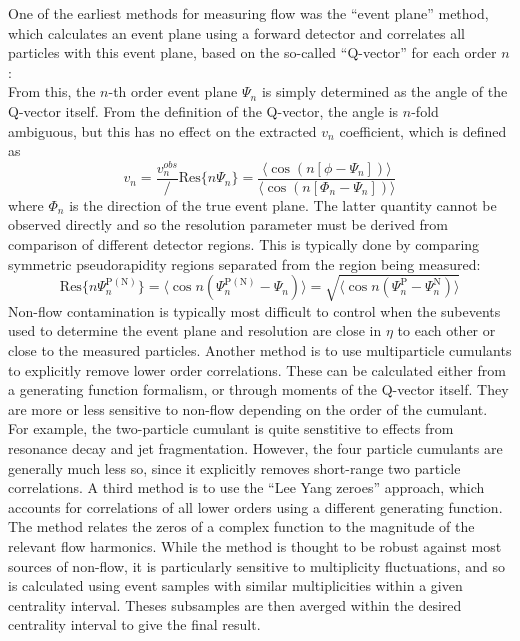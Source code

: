 One of the earliest methods for measuring flow was the ``event plane'' method, which calculates an event plane using
a forward detector and correlates all particles with this event plane, based on the so-called ``Q-vector'' for each order $n$:
\begin{equation}
\end{equation}
From this, the $n$-th order event plane $\Psi_n$ is simply determined as the angle of the Q-vector itself.  
From the definition of the Q-vector, the angle is $n$-fold ambiguous, but this has no effect on the extracted
$v_n$ coefficient, which is defined as 
\begin{equation}
v_n = \frac{v^{obs}_n}/\mathrm{Res}\{ n \Psi_n \} = \frac{ \langle \cos ( n [\phi - \Psi_n] ) \rangle }{ \langle \cos ( n [\Phi_n - \Psi_n] ) \rangle    }
\end{equation}
where $\Phi_n$ is the direction of the true event plane.  The latter quantity cannot be observed directly and so the 
resolution parameter must be derived from comparison of different detector regions.  This is typically done by comparing
symmetric pseudorapidity regions separated from the region being measured:
\begin{equation}
\mathrm{Res} \{ n \Psi_n^{\mathrm{P(N)}} \} =
\langle \cos n ( \Psi_n^{\mathrm{P(N)}} - \Psi_n ) \rangle = 
\sqrt{ \langle \cos n ( \Psi_n^{\mathrm{P}} - \Psi_n^{\mathrm{N}} ) \rangle }
\end{equation}
Non-flow contamination is typically most difficult to control when the subevents used to determine the event plane
and resolution are close in $\eta$ to each other or close to the measured particles.
%
Another method is to use multiparticle cumulants to explicitly remove lower order correlations.
These can be calculated either from a generating function formalism, or through moments of the Q-vector itself.
They are more or less sensitive to non-flow depending on the order of the cumulant.  For example, the two-particle
cumulant is quite senstitive to effects from resonance decay and jet fragmentation.  However, the four particle
cumulants are generally much less so, since it explicitly removes short-range two particle correlations.
%
A third method is to use the ``Lee Yang zeroes'' approach, which accounts for correlations of all lower orders using a
different generating function.  The method relates the zeros of a complex function to the magnitude of the relevant
flow harmonics.  While the method is thought to be robust against most sources of non-flow, it is particularly sensitive to
multiplicity fluctuations, and so is calculated using event samples with similar multiplicities within a given 
centrality interval.  Theses subsamples are then averged within the desired centrality interval to give the final result.

